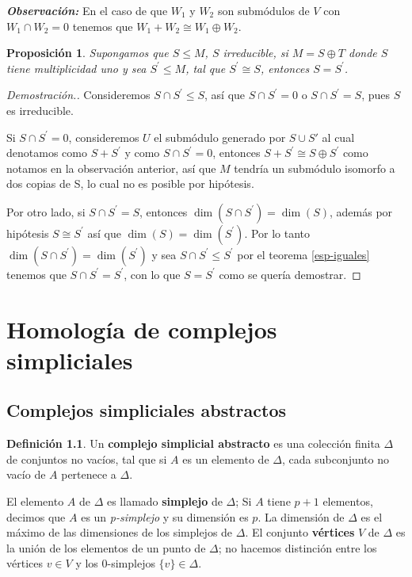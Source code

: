 \documentclass[12pt]{book}
\newtheorem{proposition}[theorem]{Proposición}
\theoremstyle{definition}
\newtheorem{definition}[theorem]{Definición}
\newcounter{in}
\newcounter{ini}
\begin{document}
\textbf{\emph{Observación:}} En el caso de que $W_{1}$ y $W_{2}$ son
submódulos de $V$ con $W_{1}\cap W_{2}=0$ tenemos que
$W_{1}+W_{2}\cong W_{1}\oplus W_{2}$.

\begin{proposition}
  Supongamos que $S\leq M$, $S$ irreducible, si $M=S\oplus T$ donde $S$
  tiene multiplicidad uno y sea $S^{'}\leq M$, tal que $S^{'}\cong S$, entonces $S=S^{'}$.
\end{proposition}

\begin{proof}[Demostración.]
  Consideremos $S\cap S^{'}\leq S$, así que $S\cap S^{'}=0$ o $S\cap
  S^{'}=S$, pues $S$ es irreducible.

  Si $S\cap S^{'}=0$, consideremos $U$ el submódulo generado por $S\cup S'$ al cual
  denotamos como $S+S^{'}$ y como $S\cap S^{'}=0$, entonces
  $S+S^{'}\cong S\oplus S^{'}$ como notamos en la observación anterior,
  así que $M$ tendría un submódulo isomorfo a dos copias de S, lo cual
  no es posible por hipótesis. 
  
 Por otro lado, si $S\cap S^{'}=S$, entonces $\dim (S\cap
 S^{'})=\dim(S)$, además por hipótesis $S\cong S^{'}$ así que
 $\dim(S)=\dim(S^{'})$. Por lo tanto $\dim(S\cap S^{'})=\dim(S^{'})$ y
 sea $S\cap S^{'}\leq S^{'}$ por el teorema \ref{esp-iguales} tenemos
 que $S\cap S^{'}=S^{'}$, con lo que $S=S^{'}$ como se quería demostrar.
\end{proof}

\chapter{Homología de complejos simpliciales}

\section{Complejos simpliciales abstractos}

\begin{definition}
Un \textbf{complejo simplicial abstracto} es una colección finita
$\Delta$ de conjuntos no vacíos, tal que si $A$ es un elemento de $\Delta$,
cada subconjunto no vacío de $A$ pertenece a $\Delta$.
\end{definition}

El elemento $A$ de $\Delta$ es llamado \textbf{simplejo} de
$\Delta$; Si $A$ tiene $p+1$ elementos, decimos que $A$ es un
\emph{p-simplejo} y su dimensión es $p$. La dimensión de $\Delta$
es el máximo de las dimensiones de los simplejos de $\Delta$. El
conjunto \textbf{vértices} $V$ de $\Delta$ es la unión de los
elementos de un punto de $\Delta$; no hacemos distinción entre los
vértices $v\in V$ y los $0$-simplejos $\{v\}\in \Delta$. 
\end{document}
